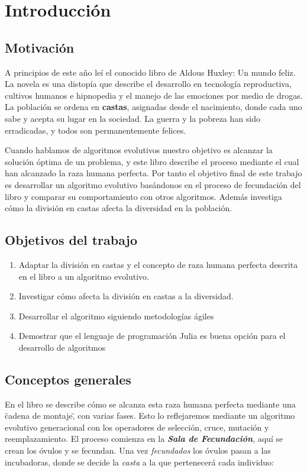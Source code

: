 \chapter{Introducción}

\section{Motivación}

A principios de este año leí el conocido libro de Aldous Huxley: Un mundo feliz. La novela es una
distopía que describe el desarrollo en tecnología reproductiva, cultivos humanos e hipnopedia y el manejo de las
emociones por medio de drogas. La población se ordena en \textbf{castas}, asignadas desde el nacimiento, donde cada uno
sabe y acepta su lugar en la sociedad. La guerra y la pobreza han sido erradicadas, y todos son permanentemente
felices.

Cuando hablamos de algoritmos evolutivos nuestro objetivo es alcanzar la solución óptima de un problema, y este libro describe el 
proceso mediante el cual han alcanzado la raza humana perfecta. Por tanto el objetivo final de este trabajo es desarrollar
un algoritmo evolutivo basándonos en el proceso de fecundación del libro y comparar su comportamiento con otros algoritmos. Además
investiga cómo la división en castas afecta la diversidad en la población.

\section{Objetivos del trabajo}

\begin{enumerate}
    \item Adaptar la división en castas y el concepto de raza humana perfecta descrita en el libro a un algoritmo evolutivo.
    \item Investigar cómo afecta la división en castas a la diversidad.
    \item Desarrollar el algoritmo siguiendo metodologías ágiles
    \item Demostrar que el lenguaje de programación Julia es buena opción para el desarrollo de algoritmos
\end{enumerate}

\section{Conceptos generales}

En el libro se describe cómo se alcanza esta raza humana perfecta mediante una \"cadena de montaje\", con
varias fases. Esto lo reflejaremos mediante un algoritmo evolutivo generacional con los operadores de selección, cruce, mutación
y reemplazamiento. El proceso comienza en la \textbf{\textit{Sala de Fecundación}}, aquí se crean los óvulos y se fecundan. Una
vez \textit{fecundados} los óvulos pasan a las incubadoras, donde se decide la \textit{casta} a la que pertenecerá cada individuo:

